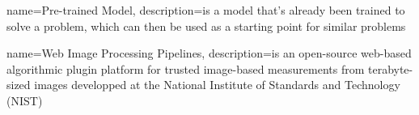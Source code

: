 {
    name=Pre-trained Model,
    description={is a model that's already been trained to solve a problem,
    which can then be used as a starting point for similar problems}
}


{
    name=Web Image Processing Pipelines,
    description={is an open-source web-based algorithmic plugin platform for
    trusted image-based measurements from terabyte-sized images developped at
    the National Institute of Standards and Technology (NIST)}
}

